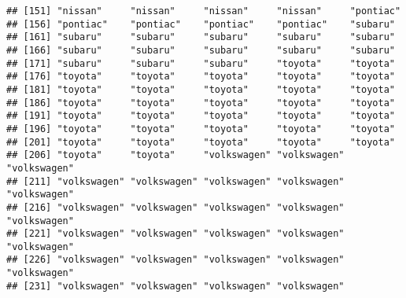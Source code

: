 \documentclass[
]{article}
\newenvironment{Shaded}{\begin{snugshade}}{\end{snugshade}}
\newcommand{\NormalTok}[1]{#1}
\newcommand{\SpecialCharTok}[1]{\textcolor[rgb]{0.00,0.00,0.00}{#1}}
\begin{document}
\begin{verbatim}
## [151] "nissan"     "nissan"     "nissan"     "nissan"     "pontiac"   
## [156] "pontiac"    "pontiac"    "pontiac"    "pontiac"    "subaru"    
## [161] "subaru"     "subaru"     "subaru"     "subaru"     "subaru"    
## [166] "subaru"     "subaru"     "subaru"     "subaru"     "subaru"    
## [171] "subaru"     "subaru"     "subaru"     "toyota"     "toyota"    
## [176] "toyota"     "toyota"     "toyota"     "toyota"     "toyota"    
## [181] "toyota"     "toyota"     "toyota"     "toyota"     "toyota"    
## [186] "toyota"     "toyota"     "toyota"     "toyota"     "toyota"    
## [191] "toyota"     "toyota"     "toyota"     "toyota"     "toyota"    
## [196] "toyota"     "toyota"     "toyota"     "toyota"     "toyota"    
## [201] "toyota"     "toyota"     "toyota"     "toyota"     "toyota"    
## [206] "toyota"     "toyota"     "volkswagen" "volkswagen" "volkswagen"
## [211] "volkswagen" "volkswagen" "volkswagen" "volkswagen" "volkswagen"
## [216] "volkswagen" "volkswagen" "volkswagen" "volkswagen" "volkswagen"
## [221] "volkswagen" "volkswagen" "volkswagen" "volkswagen" "volkswagen"
## [226] "volkswagen" "volkswagen" "volkswagen" "volkswagen" "volkswagen"
## [231] "volkswagen" "volkswagen" "volkswagen" "volkswagen"
\end{verbatim}

\begin{Shaded}
\end{Shaded}
\end{document}
